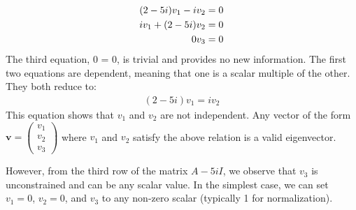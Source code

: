 \begin{enumerate}
\begin{align*}
    (2 - 5i)v_1 - iv_2 &= 0 \\
    iv_1 + (2 - 5i)v_2 &= 0 \notag\\
    0v_3 &= 0
\end{align*}
The third equation,  0 = 0, is trivial and provides no new information. The first two equations are dependent, meaning that one is a scalar multiple of the other. They both reduce to:
\begin{align*}
    (2 - 5i)v_1 = iv_2
\end{align*}
This equation shows that $v_1$ and $v_2$ are not independent. Any vector of the form $\displaystyle\mathbf{v} = \begin{pmatrix} v_1 \\ v_2 \\ v_3 \end{pmatrix}$ where $v_1$ and $v_2$ satisfy the above relation is a valid eigenvector.

However, from the third row of the matrix $A - 5iI$, we observe that $v_3$ is unconstrained and can be any scalar value. In the simplest case, we can set  $v_1 = 0$, $v_2 = 0$, and $v_3$ to any non-zero scalar (typically 1 for normalization). 
        

\end{enumerate}
